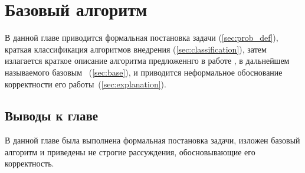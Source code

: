 \chapter{Базовый алгоритм}

В данной главе приводится формальная постановка задачи (\ref{sec:prob_def}), 
краткая классификация алгоритмов внедрения (\ref{sec:classification}), затем
излагается краткое описание алгоритма предложеннго в работе \cite{Ohbuchi}, в дальнейшем называемого базовым~ 
(\ref{sec:base}), и приводится неформальное обоснование корректности его работы~(\ref{sec:explanation}).





\section{Выводы к главе}
В данной главе была выполнена формальная постановка задачи, изложен базовый алгоритм и приведены не строгие рассуждения, обосновывающие его корректность.
